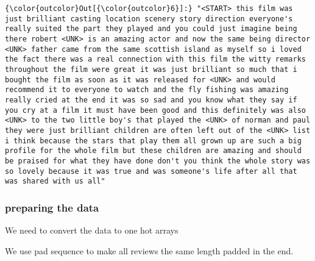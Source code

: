 \documentclass[11pt]{article}
\begin{document}
\begin{Verbatim}[commandchars=\\\{\}]
{\color{outcolor}Out[{\color{outcolor}6}]:} "<START> this film was just brilliant casting location scenery story direction everyone's really suited the part they played and you could just imagine being there robert <UNK> is an amazing actor and now the same being director <UNK> father came from the same scottish island as myself so i loved the fact there was a real connection with this film the witty remarks throughout the film were great it was just brilliant so much that i bought the film as soon as it was released for <UNK> and would recommend it to everyone to watch and the fly fishing was amazing really cried at the end it was so sad and you know what they say if you cry at a film it must have been good and this definitely was also <UNK> to the two little boy's that played the <UNK> of norman and paul they were just brilliant children are often left out of the <UNK> list i think because the stars that play them all grown up are such a big profile for the whole film but these children are amazing and should be praised for what they have done don't you think the whole story was so lovely because it was true and was someone's life after all that was shared with us all"
\end{Verbatim}
            
    \hypertarget{preparing-the-data}{%
\subsubsection{preparing the data}\label{preparing-the-data}}

We need to convert the data to one hot arrays

    We use pad sequence to make all reviews the same length padded in the
end.
\end{document}
